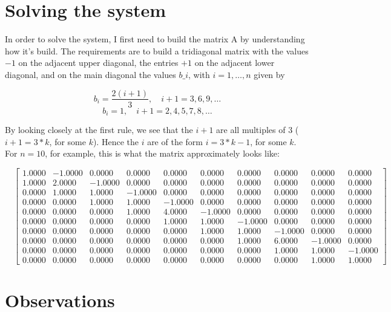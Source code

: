 \documentclass{article}
\begin{document}
\section{Solving the system}
In order to solve the system, I first need to build the matrix A by understanding how it's build. The requirements are to build a tridiagonal matrix with the values $-1$ on the adjacent upper diagonal, the entries $+1$ on the adjacent lower diagonal, and on the main diagonal the values $b\_i$, with $i = 1, \ldots, n$ given by

$$b_i =\frac{2(i+1)}{3},\quad i + 1= 3, 6, 9,\ldots$$
$$b_i =1,\quad i + 1 = 2, 4, 5, 7, 8, \ldots$$

By looking closely at the first rule, we see that the $i+1$ are all multiples of 3 ($i+1 = 3*k$, for some $k$). Hence the $i$ are of the form $i = 3*k-1$, for some $k$. For $n = 10$, for example, this is what the matrix approximately looks like:

$$
\quad
\begin{bmatrix}
1.0000 & -1.0000 & 0.0000 & 0.0000 & 0.0000 & 0.0000 & 0.0000 & 0.0000 & 0.0000 & 0.0000 \\
1.0000 & 2.0000 & -1.0000 & 0.0000 & 0.0000 & 0.0000 & 0.0000 & 0.0000 & 0.0000 & 0.0000 \\
0.0000 & 1.0000 & 1.0000 & -1.0000 & 0.0000 & 0.0000 & 0.0000 & 0.0000 & 0.0000 & 0.0000 \\
0.0000 & 0.0000 & 1.0000 & 1.0000 & -1.0000 & 0.0000 & 0.0000 & 0.0000 & 0.0000 & 0.0000 \\
0.0000 & 0.0000 & 0.0000 & 1.0000 & 4.0000 & -1.0000 & 0.0000 & 0.0000 & 0.0000 & 0.0000 \\
0.0000 & 0.0000 & 0.0000 & 0.0000 & 1.0000 & 1.0000 & -1.0000 & 0.0000 & 0.0000 & 0.0000 \\
0.0000 & 0.0000 & 0.0000 & 0.0000 & 0.0000 & 1.0000 & 1.0000 & -1.0000 & 0.0000 & 0.0000 \\
0.0000 & 0.0000 & 0.0000 & 0.0000 & 0.0000 & 0.0000 & 1.0000 & 6.0000 & -1.0000 & 0.0000 \\
0.0000 & 0.0000 & 0.0000 & 0.0000 & 0.0000 & 0.0000 & 0.0000 & 1.0000 & 1.0000 & -1.0000 \\
0.0000 & 0.0000 & 0.0000 & 0.0000 & 0.0000 & 0.0000 & 0.0000 & 0.0000 & 1.0000 & 1.0000
\end{bmatrix}
$$

\section{Observations}
\end{document}
